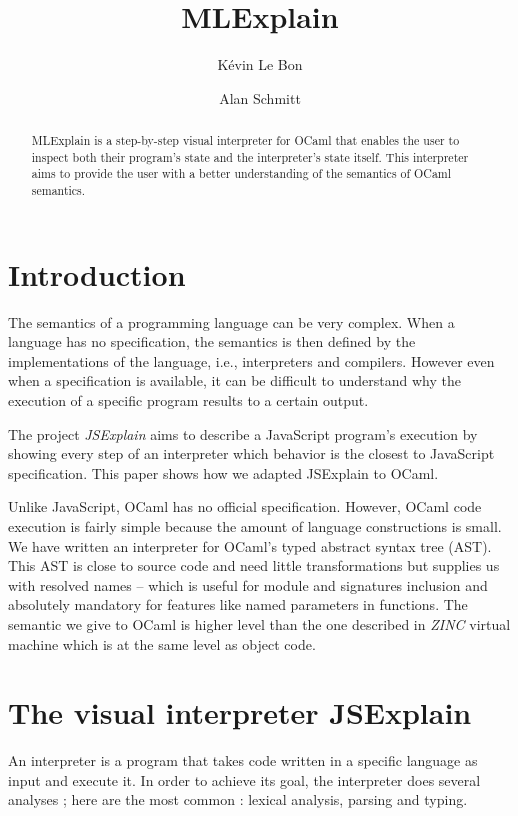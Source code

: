 \documentclass[twocolumn]{article}
\author{ K\'evin Le Bon \and Alan Schmitt }
\title{MLExplain}
\begin{document}
\maketitle

\begin{abstract}
  MLExplain is a step-by-step visual interpreter for OCaml that enables the
  user to inspect both their program's state and the interpreter's state
  itself. This interpreter aims to provide the user with a better understanding
  of the semantics of OCaml semantics.
\end{abstract}

\section{Introduction}

The semantics of a programming language can be very complex. When a language
has no specification, the semantics is then defined by the implementations of
the language, i.e., interpreters and compilers. However even when a
specification is available, it can be difficult to understand why the execution
of a specific program results to a certain output.

The project \emph{JSExplain} \cite{chargueraud:hal-01745792} aims
to describe a JavaScript program's execution by showing every step of an
interpreter which behavior is the closest to JavaScript specification. This
paper shows how we adapted JSExplain to OCaml.

Unlike JavaScript, OCaml has no official specification. However, OCaml code
execution is fairly simple because the amount of language constructions is
small. We have written an interpreter for OCaml's typed abstract syntax tree
(AST). This AST is close to source code and need little transformations but
supplies us with resolved names -- which is useful for module and signatures
inclusion and absolutely mandatory for features like named parameters in
functions.  The semantic we give to OCaml is higher level than the one
described in \emph{ZINC} \cite{Leroy-ZINC} virtual machine which is at the same
level as object code.

\section{The visual interpreter JSExplain}

An interpreter is a program that takes code written in a specific language as
input and execute it. In order to achieve its goal, the interpreter does
several analyses ; here are the most common : lexical analysis, parsing and
typing.
\end{document}
